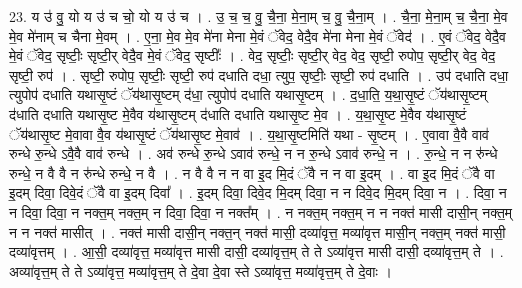 \documentclass[17pt]{extarticle}
\begin{document}
23. य उ॑ वु॒ यो य उ॑ च चो॒ यो य उ॑ च । . उ॒ च॒ च॒ वु॒ चै॒ना॒ मे॒ना॒म् च॒ वु॒ चै॒ना॒म् । . चै॒ना॒ मे॒ना॒म् च॒ चै॒ना॒ मे॒व मे॒व मे॑नाम् च चैना मे॒वम् । . ए॒ना॒ मे॒व मे॒व मे॑ना मेना मे॒वं ॅवेद॒ वेदै॒व मे॑ना मेना मे॒वं ॅवेद॑ । . ए॒वं ॅवेद॒ वेदै॒व मे॒वं ॅवेद॒ सृष्टीः॒ सृष्टी॒र् वेदै॒व मे॒वं ॅवेद॒ सृष्टीः᳚ । . वेद॒ सृष्टीः॒ सृष्टी॒र् वेद॒ वेद॒ सृष्टी॒ रुपोप॒ सृष्टी॒र् वेद॒ वेद॒ सृष्टी॒ रुप॑ । . सृष्टी॒ रुपोप॒ सृष्टीः॒ सृष्टी॒ रुप॑ दधाति दधा॒ त्युप॒ सृष्टीः॒ सृष्टी॒ रुप॑ दधाति । . उप॑ दधाति दधा॒ त्युपोप॑ दधाति यथासृ॒ष्टं ॅय॑थासृ॒ष्टम् द॑धा॒ त्युपोप॑ दधाति यथासृ॒ष्टम् । . द॒धा॒ति॒ य॒था॒सृ॒ष्टं ॅय॑थासृ॒ष्टम् द॑धाति दधाति यथासृ॒ष्ट मे॒वैव य॑थासृ॒ष्टम् द॑धाति दधाति यथासृ॒ष्ट मे॒व । . य॒था॒सृ॒ष्ट मे॒वैव य॑थासृ॒ष्टं ॅय॑थासृ॒ष्ट मे॒वावा वै॒व य॑थासृ॒ष्टं ॅय॑थासृ॒ष्ट मे॒वाव॑ । . य॒था॒सृ॒ष्टमिति॑ यथा - सृ॒ष्टम् । . ए॒वावा वै॒वै वाव॑ रुन्धे रु॒न्धे ऽवै॒वै वाव॑ रुन्धे । . अव॑ रुन्धे रु॒न्धे ऽवाव॑ रुन्धे॒ न न रु॒न्धे ऽवाव॑ रुन्धे॒ न । . रु॒न्धे॒ न न रु॑न्धे रुन्धे॒ न वै वै न रु॑न्धे रुन्धे॒ न वै । . न वै वै न न वा इ॒द मि॒दं ॅवै न न वा इ॒दम् । . वा इ॒द मि॒दं ॅवै वा इ॒दम् दिवा॒ दिवे॒दं ॅवै वा इ॒दम् दिवा᳚ । . इ॒दम् दिवा॒ दिवे॒द मि॒दम् दिवा॒ न न दिवे॒द मि॒दम् दिवा॒ न । . दिवा॒ न न दिवा॒ दिवा॒ न नक्त॒म् नक्त॒म् न दिवा॒ दिवा॒ न नक्त᳚म् । . न नक्त॒म् नक्त॒म् न न नक्त॑ मासी दासी॒न् नक्त॒म् न न नक्त॑ मासीत् । . नक्त॑ मासी दासी॒न् नक्त॒न् नक्त॑ मासी॒ दव्या॑वृत्त॒ मव्या॑वृत्त मासी॒न् नक्त॒म् नक्त॑ मासी॒ दव्या॑वृत्तम् । . आ॒सी॒ दव्या॑वृत्त॒ मव्या॑वृत्त मासी दासी॒ दव्या॑वृत्त॒म् ते ते ऽव्या॑वृत्त मासी
दासी॒ दव्या॑वृत्त॒म् ते । . अव्या॑वृत्त॒म् ते ते ऽव्या॑वृत्त॒ मव्या॑वृत्त॒म् ते दे॒वा दे॒वा स्ते ऽव्या॑वृत्त॒ मव्या॑वृत्त॒म् ते दे॒वाः । \newline
\end{document}
